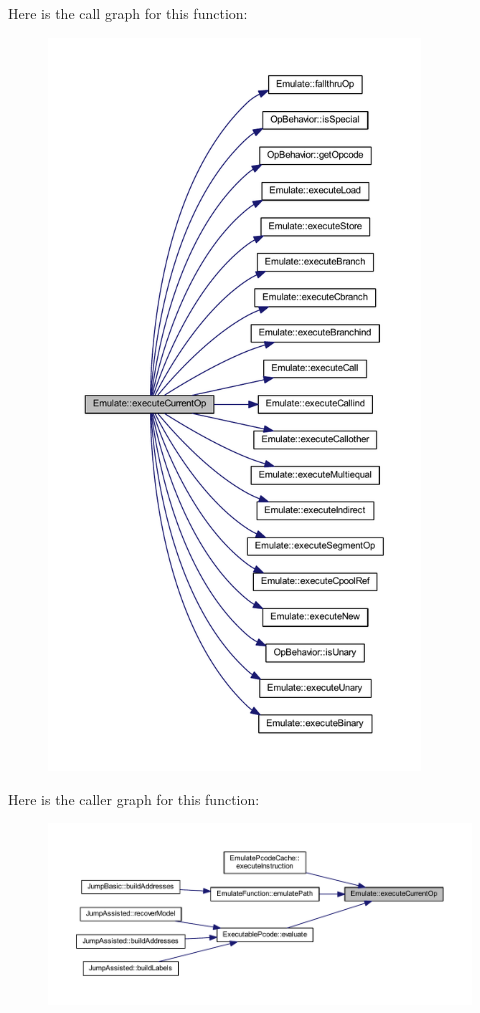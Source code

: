 Here is the call graph for this function\+:
\nopagebreak
\begin{figure}[H]
\begin{center}
\leavevmode
\includegraphics[height=550pt]{class_emulate_aad37ba97a90d7cd5338a75afce3a21b9_cgraph}
\end{center}
\end{figure}
Here is the caller graph for this function\+:
\nopagebreak
\begin{figure}[H]
\begin{center}
\leavevmode
\includegraphics[width=350pt]{class_emulate_aad37ba97a90d7cd5338a75afce3a21b9_icgraph}
\end{center}
\end{figure}
\mbox{\label{class_emulate_aa791523787e5154d73bfe0e846a2cd38}} 
